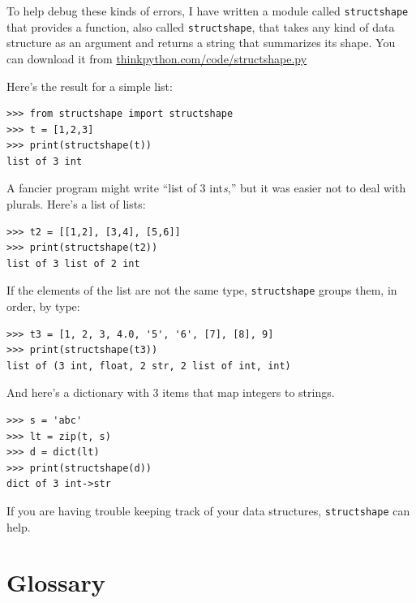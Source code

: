 \documentclass[10pt]{book}
\begin{document}

To help debug these kinds of errors, I have written a module
called {\tt structshape} that provides a function, also called
{\tt structshape}, that takes any kind of data structure as
an argument and returns a string that summarizes its shape.
You can download it from \url{thinkpython.com/code/structshape.py}

Here's the result for a simple list:

\beforeverb
\begin{verbatim}
>>> from structshape import structshape
>>> t = [1,2,3]
>>> print(structshape(t))
list of 3 int
\end{verbatim}
\afterverb
%
A fancier program might write ``list of 3 int{\em s},'' but it
was easier not to deal with plurals.  Here's a list of lists:

\beforeverb
\begin{verbatim}
>>> t2 = [[1,2], [3,4], [5,6]]
>>> print(structshape(t2))
list of 3 list of 2 int
\end{verbatim}
\afterverb
%
If the elements of the list are not the same type,
{\tt structshape} groups them, in order, by type:

\beforeverb
\begin{verbatim}
>>> t3 = [1, 2, 3, 4.0, '5', '6', [7], [8], 9]
>>> print(structshape(t3))
list of (3 int, float, 2 str, 2 list of int, int)
\end{verbatim}
\afterverb
%

And here's a dictionary with 3 items that map integers to strings.

\beforeverb
\begin{verbatim}
>>> s = 'abc'
>>> lt = zip(t, s)
>>> d = dict(lt) 
>>> print(structshape(d))
dict of 3 int->str
\end{verbatim}
\afterverb
%
If you are having trouble keeping track of your data structures,
{\tt structshape} can help.


\section{Glossary}
\end{document}
